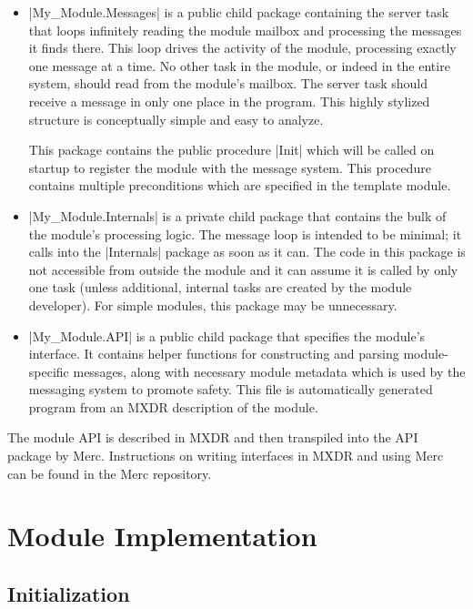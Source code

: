 \begin{itemize}
\item |My_Module.Messages| is a public child package containing the server task that loops
  infinitely reading the module mailbox and processing the messages it finds there. This loop
  drives the activity of the module, processing exactly one message at a time. No other task in
  the module, or indeed in the entire system, should read from the module's mailbox. The server task should receive a message in only one place in the program. This highly
  stylized structure is conceptually simple and easy to analyze.

  This package contains the public procedure |Init| which will be called on startup to register the module with the message system. This procedure contains multiple preconditions which are specified in the template module.

\item |My_Module.Internals| is a private child package that contains the bulk of the module's
  processing logic. The message loop is intended to be minimal; it calls into the |Internals|
  package as soon as it can. The code in this package is not accessible from outside the module
  and it can assume it is called by only one task (unless additional, internal tasks are created
  by the module developer). For simple modules, this package may be unnecessary.

\item |My_Module.API| is a public child package that specifies the module's interface. It contains helper functions for constructing
  and parsing module-specific messages, along with necessary module metadata which is used by the messaging system to promote safety. This file is automatically generated program from an MXDR description of the module.
\end{itemize}

The module API is described in MXDR and then transpiled into the API package by Merc. Instructions on writing interfaces in MXDR and using Merc can be found in the Merc repository.

\section{Module Implementation}
\label{sec:module-implementation}

\subsection{Initialization}

